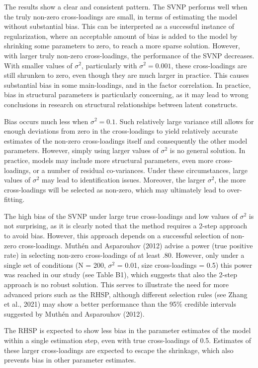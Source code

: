 \documentclass[
  man, donotrepeattitle,floatsintext]{apa6}
\begin{document}
The results show a clear and consistent pattern. The SVNP performs well when the truly non-zero cross-loadings are small, in terms of estimating the model without substantial bias. This can be interpreted as a successful instance of regularization, where an acceptable amount of bias is added to the model by shrinking some parameters to zero, to reach a more sparse solution. However, with larger truly non-zero cross-loadings, the performance of the SVNP decreases. With smaller values of \(\sigma^2\), particularly with \(\sigma^2 = 0.001\), these cross-loadings are still shrunken to zero, even though they are much larger in practice. This causes substantial bias in some main-loadings, and in the factor correlation. In practice, bias in structural parameters is particularly concerning, as it may lead to wrong conclusions in research on structural relationships between latent constructs.

Bias occurs much less when \(\sigma^2 = 0.1\). Such relatively large variance still allows for enough deviations from zero in the cross-loadings to yield relatively accurate estimates of the non-zero cross-loadings itself and consequently the other model parameters. However, simply using larger values of \(\sigma^2\) is no general solution. In practice, models may include more structural parameters, even more cross-loadings, or a number of residual co-variances. Under these circumstances, large values of \(\sigma^2\) may lead to identification issues. Moreover, the larger \(\sigma^2\), the more cross-loadings will be selected as non-zero, which may ultimately lead to over-fitting.

The high bias of the SVNP under large true cross-loadings and low values of \(\sigma^2\) is not surprising, as it is clearly noted that the method requires a 2-step approach to avoid bias. However, this approach depends on a successful selection of non-zero cross-loadings. Muthén and Asparouhov (2012) advise a power (true positive rate) in selecting non-zero cross-loadings of at least .80. However, only under a single set of conditions (N = 200, \(\sigma^2\) = 0.01, size cross-loadings = 0.5) this power was reached in our study (see Table B1), which suggests that also the 2-step approach is no robust solution. This serves to illustrate the need for more advanced priors such as the RHSP, although different selection rules (see Zhang et al., 2021) may show a better performance than the 95\% credible intervals suggested by Muthén and Asparouhov (2012).

The RHSP is expected to show less bias in the parameter estimates of the model within a single estimation step, even with true cross-loadings of 0.5. Estimates of these larger cross-loadings are expected to escape the shrinkage, which also prevents bias in other parameter estimates.
\end{document}
